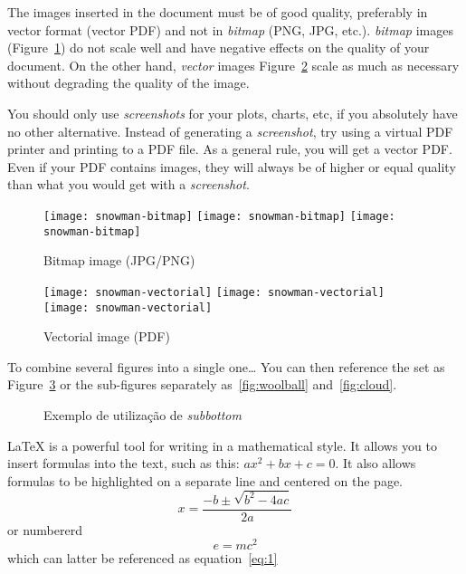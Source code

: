 The images inserted in the document must be of good quality, preferably in vector format (vector PDF) and not in \emph{bitmap} (PNG, JPG, etc.). \emph{bitmap} images (Figure~\ref{fig:Figures_Tree_silhouettes-bitmap}) do not scale well and have negative effects on the quality of your document. On the other hand, \emph{vector} images {Figure~\ref{fig:Figures_Tree_silhouettes-vectorial}} scale as much as necessary without degrading the quality of the image.

You should only use \emph{screenshots} for your plots, charts, etc, if you absolutely have no other alternative. Instead of generating a \emph{screenshot}, try using a virtual PDF printer and printing to a PDF file. As a general rule, you will get a vector PDF. Even if your PDF contains images, they will always be of higher or equal quality than what you would get with a \emph{screenshot}.

\begin{figure}[htbp]
  \centering
  \texttt{[image: snowman-bitmap]}
  \texttt{[image: snowman-bitmap]}
  \texttt{[image: snowman-bitmap]}
  \caption{Bitmap image (JPG/PNG)}
  \label{fig:Figures_Tree_silhouettes-bitmap}
\end{figure}

\begin{figure}[htbp]
  \centering
  \texttt{[image: snowman-vectorial]}
  \texttt{[image: snowman-vectorial]}
  \texttt{[image: snowman-vectorial]}
  \caption{Vectorial image (PDF)}
  \label{fig:Figures_Tree_silhouettes-vectorial}
\end{figure}

To combine several figures into a single one… You can then reference the set as Figure~\ref{fig:complete-figure} or the sub-figures separately as~\ref{fig:woolball} and~\ref{fig:cloud}.

\begin{figure}[htbp]
  \centering
\qquad\qquad
  \caption{Exemplo de utilização de \emph{subbottom}}
  \label{fig:complete-figure}
\end{figure}


LaTeX is a powerful tool for writing in a mathematical style. It allows you to insert formulas into the text, such as this: $ax^2 + bx + c = 0$. It also allows formulas to be highlighted on a separate line and centered on the page.
\[ x = \frac{-b \pm \sqrt{b^2-4ac}}{2a} \]
or numbererd
\begin{equation}
e = mc^2
\label{eq:1}
\end{equation}
which can latter be referenced as equation~\ref{eq:1}

